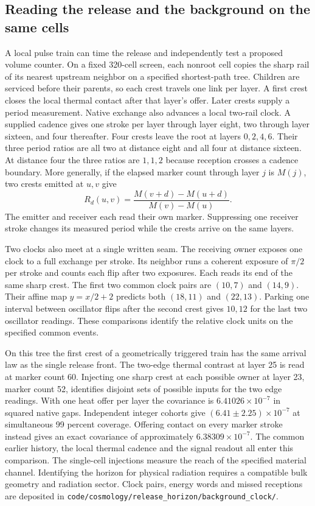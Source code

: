 \documentclass[11pt]{article}
\newcommand{\pathref}[1]{\nolinkurl{#1}}
\theoremstyle{remark}
\begin{document}
\subsection{Reading the release and the background on the same cells}

A local pulse train can time the release and independently test a proposed
volume counter. On a fixed 320-cell screen, each nonroot cell copies the
sharp rail of its nearest upstream neighbor on a specified shortest-path
tree. Children are serviced before their parents, so each crest travels one
link per layer. A first crest closes the local thermal contact after that
layer's offer. Later crests supply a period measurement. Native exchange
also advances a local two-rail clock. A supplied cadence gives one stroke
per layer through layer eight, two through layer sixteen, and four thereafter.
Four crests leave the root at layers \(0,2,4,6\). Their three period ratios
are all two at distance eight and all four at distance sixteen. At distance
four the three ratios are \(1,1,2\) because reception crosses a cadence
boundary. More generally, if the elapsed marker count through layer \(j\)
is \(M(j)\), two crests emitted at \(u,v\) give
\[
 R_d(u,v)=\frac{M(v+d)-M(u+d)}{M(v)-M(u)}.
\]
The emitter and receiver each read their own marker. Suppressing one
receiver stroke changes its measured period while the crests arrive on
the same layers.

Two clocks also meet at a single written seam. The receiving owner
exposes one clock to a full exchange per stroke. Its neighbor runs a
coherent exposure of \(\pi/2\) per stroke and counts each flip after
two exposures. Each reads its end of the same sharp crest. The first two
common clock pairs are \((10,7)\) and \((14,9)\). Their affine map
\(y=x/2+2\) predicts both \((18,11)\) and \((22,13)\). Parking one
interval between oscillator flips after the second crest gives \(10,12\) for the
last two oscillator readings. These comparisons identify the relative
clock units on the specified common events.

On this tree the first crest of a geometrically triggered train has the
same arrival law as the single release front. The two-edge thermal
contrast at layer 25 is read at marker count 60. Injecting one sharp
crest at each possible owner at layer 23, marker count 52, identifies
disjoint sets of possible inputs for the two edge readings. With one
heat offer per layer the covariance is \(6.41026\times10^{-7}\) in
squared native gaps. Independent integer cohorts give
\((6.41\pm2.25)\times10^{-7}\) at simultaneous 99 percent coverage.
Offering contact on every marker stroke instead gives an exact covariance
of approximately \(6.38309\times10^{-7}\). The common earlier history,
the local thermal cadence and the signal readout all enter this comparison.
The single-cell injections measure the reach of the specified material
channel. Identifying the horizon for physical radiation requires a
compatible bulk geometry and radiation sector. Clock pairs, energy words
and missed receptions are deposited in
\pathref{code/cosmology/release_horizon/background_clock/}.
\end{document}
